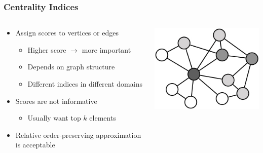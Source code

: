 \documentclass{beamer}
\begin{document}

\begin{frame}
\frametitle{Centrality Indices}


\begin{columns}
\begin{column}{0.6\textwidth}
	\begin{itemize}
		\item Assign scores to vertices or edges
		\begin{itemize}
			\item Higher score $\rightarrow$ more important
			\item Depends on graph structure
			\item Different indices in different domains
		\end{itemize}
		\item Scores are not informative
		\begin{itemize}
			\item Usually want top $k$ elements
		\end{itemize}
		\item Relative order-preserving approximation is acceptable
	\end{itemize}
\end{column}
\begin{column}{0.4\textwidth}  %
\begin{center}
	\includegraphics[width=1.0\textwidth]{centrality_greyscale}
\end{center}
\end{column}


\end{columns}
\end{frame}
\end{document}
